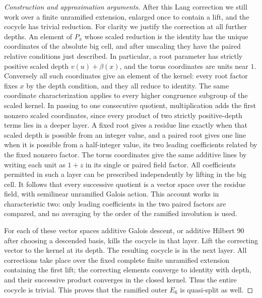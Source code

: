 \documentclass[11pt,a4paper,openany,oneside]{book}
\theoremstyle{resultstyle}
\theoremstyle{definition}
\numberwithin{equation}{chapter}
\begin{document}
\begin{proof}[Construction and approximation arguments]
After this Lang correction we still work over a finite unramified
extension, enlarged once to contain a lift, and the cocycle
has trivial reduction. For clarity we justify the correction
at all further depths. An element of \(P_x\) whose scaled
reduction is the identity has the unique coordinates of the
absolute big cell, and after unscaling they have the paired
relative conditions just described. In particular, a root
parameter has strictly positive scaled depth
\(v(u)+\beta(x)\), and the torus coordinates are units near
\(1\). Conversely all such coordinates give an element of
the kernel: every root factor fixes \(x\) by the depth
condition, and they all reduce to identity. The same
coordinate characterization applies to every higher
congruence subgroup of the scaled kernel. In passing to
one consecutive quotient, multiplication adds the first
nonzero scaled coordinates, since every product of two
strictly positive-depth terms lies in a deeper layer.
A fixed root gives a residue line exactly when that scaled
depth is possible from an integer value, and a paired
root gives one line when it is possible from a half-integer
value, its two leading coefficients related by the fixed
nonzero factor. The torus coordinates give the same additive
lines by writing each unit as \(1+z\) in its single or paired
field factor. All coefficients permitted in such a layer
can be prescribed independently by lifting in the big cell.
It follows that every successive quotient is a vector space
over the residue field, with semilinear unramified Galois action.
This account works in characteristic two: only leading
coefficients in the two paired factors are compared, and
no averaging by the order of the ramified involution is used.

For each of these vector spaces additive Galois descent,
or additive Hilbert 90 after choosing a descended basis,
kills the cocycle in that layer. Lift the correcting vector
to the kernel at its depth. The resulting cocycle is in
the next layer. All corrections take place over the fixed
complete finite unramified extension containing the first
lift; the correcting elements converge to identity with
depth, and their successive product converges in the
closed kernel. Thus the entire cocycle is trivial. This
proves that the ramified outer \(E_6\) is quasi-split as well.


\end{proof}
\end{document}
